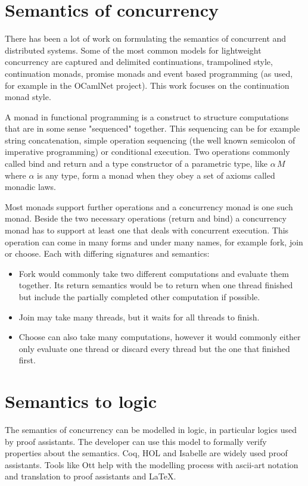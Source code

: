 \documentclass[12pt,twoside,notitlepage]{report}
\begin{document}
\section{Semantics of concurrency}

There has been a lot of work on formulating the semantics of concurrent and distributed systems. Some of the most common models for lightweight concurrency\cite{deleuzelight} are captured\cite{friedman1988applications} and delimited\cite{kiselyov2010delimited} continuations\cite{shan2004shift}, trampolined style\cite{ganz1999trampolined}, continuation monads\cite{Claessen99functionalpearls}, promise monads\cite{liskov1988promises} and event based programming (as used, for example in the OCamlNet\cite{Ocamlnet} project). This work focuses on the continuation monad style.

A monad\cite{hoareetal2001tackling} in functional programming is a construct to structure computations that are in some sense "sequenced" together. This sequencing can be for example string concatenation, simple operation sequencing (the well known semicolon of imperative programming) or conditional execution. Two operations commonly called bind and return and a type constructor of a parametric type, like $ \alpha \, M $ where $ \alpha $ is any type, form a monad when they obey a set of axioms called monadic laws.

Most monads support further operations and a concurrency monad is one such monad. Beside the two necessary operations (return and bind) a concurrency monad has to support at least one that deals with concurrent execution.  This operation can come in many forms and under many names, for example fork, join or choose. Each with differing signatures and semantics:
\begin{itemize}
\item{Fork would commonly take two different computations and evaluate them together. Its return semantics would be to return when one thread finished but include the partially completed other computation if possible.}
\item{Join may take many threads, but it waits for all threads to finish.}
\item{Choose can also take many computations, however it would commonly either only evaluate one thread or discard every thread but the one that finished first.}
\end{itemize}

\section{Semantics to logic}
The semantics of concurrency can be modelled in logic, in particular logics used by proof assistants. The developer can use this model to formally verify properties about the semantics\cite{benton2008mechanized,blazy2009mechanized,blazy2006formal,leroy2009formal}. Coq\cite{Coq}, HOL and Isabelle are widely used proof assistants. Tools like Ott\cite{Ott} help with the modelling process with ascii-art notation and translation to proof assistants and \LaTeX.
\end{document}
